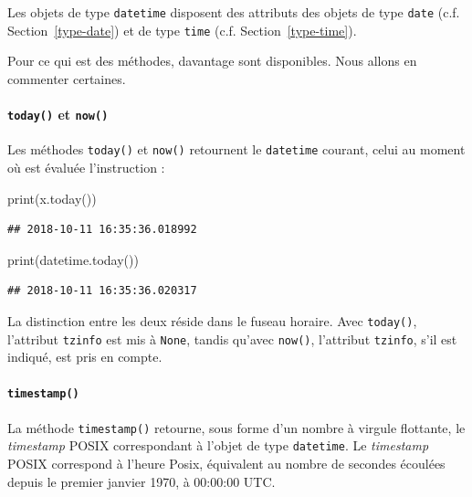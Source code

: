 \documentclass[12pt,]{book}
\newenvironment{Shaded}{\begin{snugshade}}{\end{snugshade}}
\newcommand{\BuiltInTok}[1]{#1}
\newcommand{\NormalTok}[1]{#1}
\let\oldparagraph\paragraph
\renewcommand{\paragraph}[1]{\oldparagraph{#1}\mbox{}}
\numberwithin{equation}{section}
\numberwithin{countremarque}{section}
\begin{document}
Les objets de type \texttt{datetime} disposent des attributs des objets
de type \texttt{date} (c.f. Section~\ref{type-date}) et de type
\texttt{time} (c.f. Section~\ref{type-time}).

Pour ce qui est des méthodes, davantage sont disponibles. Nous allons en
commenter certaines.

\paragraph{\texorpdfstring{\texttt{today()} et
\texttt{now()}}{today() et now()}}\label{today-et-now}

Les méthodes \texttt{today()} et \texttt{now()} retournent le
\texttt{datetime} courant, celui au moment où est évaluée l'instruction
:

\begin{Shaded}
\begin{Highlighting}[]
\BuiltInTok{print}\NormalTok{(x.today())}
\end{Highlighting}
\end{Shaded}

\begin{lstlisting}
## 2018-10-11 16:35:36.018992
\end{lstlisting}

\begin{Shaded}
\begin{Highlighting}[]
\BuiltInTok{print}\NormalTok{(datetime.today())}
\end{Highlighting}
\end{Shaded}

\begin{lstlisting}
## 2018-10-11 16:35:36.020317
\end{lstlisting}

La distinction entre les deux réside dans le fuseau horaire. Avec
\texttt{today()}, l'attribut \texttt{tzinfo} est mis à \texttt{None},
tandis qu'avec \texttt{now()}, l'attribut \texttt{tzinfo}, s'il est
indiqué, est pris en compte.

\paragraph{\texorpdfstring{\texttt{timestamp()}}{timestamp()}}\label{timestamp}

La méthode \texttt{timestamp()} retourne, sous forme d'un nombre à
virgule flottante, le \emph{timestamp} POSIX correspondant à l'objet de
type \texttt{datetime}. Le \emph{timestamp} POSIX correspond à l'heure
Posix, équivalent au nombre de secondes écoulées depuis le premier
janvier 1970, à 00:00:00 UTC.
\end{document}
